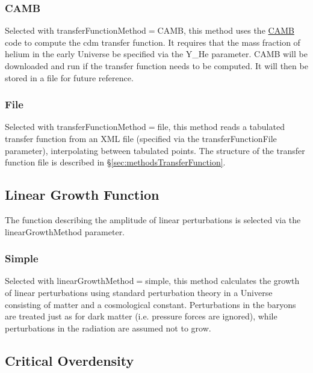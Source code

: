 \subsubsection{{\normalfont \scshape CAMB}}\label{sec:TransferFunction:CAMB}

Selected with {\normalfont \ttfamily transferFunctionMethod}$=${\normalfont \ttfamily CAMB}, this method uses the \href{http://camb.info/}{\normalfont \scshape CAMB} code to compute the \gls{cdm} transfer function. It requires that the mass fraction of helium in the early Universe be specified via the {\normalfont \ttfamily Y\_He} parameter. {\normalfont \scshape CAMB} will be downloaded and run if the transfer function needs to be computed. It will then be stored in a file for future reference.

\subsubsection{File}

Selected with {\normalfont \ttfamily transferFunctionMethod}$=${\normalfont \ttfamily file}, this method reads a tabulated transfer function from an XML file (specified via the {\normalfont \ttfamily transferFunctionFile} parameter), interpolating between tabulated points. The structure of the transfer function file is described in \S\ref{sec:methodsTransferFunction}.

\subsection{Linear Growth Function}

The function describing the amplitude of linear perturbations is selected via the {\normalfont \ttfamily linearGrowthMethod} parameter.

\subsubsection{Simple}

Selected with {\normalfont \ttfamily linearGrowthMethod}$=${\normalfont \ttfamily simple}, this method calculates the growth of linear perturbations using standard perturbation theory in a Universe consisting of matter and a cosmological constant. Perturbations in the baryons are treated just as for dark matter (i.e. pressure forces are ignored), while perturbations in the radiation are assumed not to grow.

\subsection{Critical Overdensity}\label{sec:criticalOverdensityMethod}


